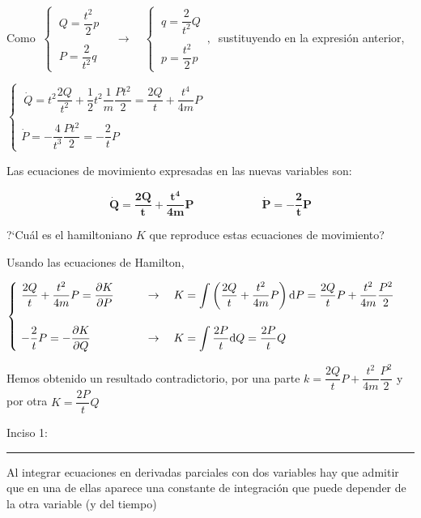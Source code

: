 Como $\ \begin{cases} \ Q=\dfrac {t^2} 2 p \\ \\ \ P=\dfrac 2 {t^2} q \end{cases} \quad  \to \quad \begin{cases} \ q=\dfrac 2{t^2} Q \\ \\ \ p=\dfrac {t^2}2 p \end{cases}\, , \ $ sustituyendo en la expresión anterior,

$\begin{cases} \ \dot Q=t^2 \dfrac{2Q}{t^2} + \dfrac 1 2 t^2 \dfrac 1 m \dfrac{Pt^2}{2}= \dfrac{2Q}{t}+\dfrac{t^4}{4m}P \\ \\ \dot P=-\dfrac 4 {t^3} \dfrac{Pt^2}{2} =-\dfrac{2}{t}P \end{cases}$

\vspace{5mm}Las ecuaciones de movimiento expresadas en las nuevas variables son:


$$\boldsymbol{\dot Q = \dfrac{2Q}{t}+\dfrac{t^4}{4m} P } \qquad \qquad  \qquad  \boldsymbol{\dot P = -\dfrac 2 t P} $$

\vspace{5mm}?`Cuál es el hamiltoniano $K$ que reproduce estas ecuaciones de movimiento?

Usando las ecuaciones de Hamilton, 

$\begin{cases} \ \dfrac{2Q}{t}+\dfrac{t^2}{4m}P=\displaystyle \pdv{K}{P} \quad & \quad \to \quad K=\displaystyle \int \left( \dfrac{2Q}{t}+\dfrac{t^2}{4m}P \right) \dd P = \dfrac{2Q}{t}P + \dfrac{t^2}{4m}\dfrac{P^2}{2} \\ \\ \ -\dfrac 2 t P = \displaystyle - \pdv{K}{Q} \quad & \quad \to \quad K=\displaystyle \int \dfrac {2P}{t} \dd Q=\dfrac{2P}{t}Q \end{cases}$
 
 Hemos obtenido un resultado contradictorio, por una parte $k=\dfrac{2Q}{t}P + \dfrac{t^2}{4m}\dfrac{P^2}{2}$ y por otra $K=\dfrac{2P}{t}Q$
 
\vspace{5mm} Inciso 1: $\quad$  \rule{200pt}{0.1pt} 

Al integrar ecuaciones en derivadas parciales con dos variables hay que admitir que en una de ellas aparece una constante de integración que puede depender de la otra variable (y del tiempo)

